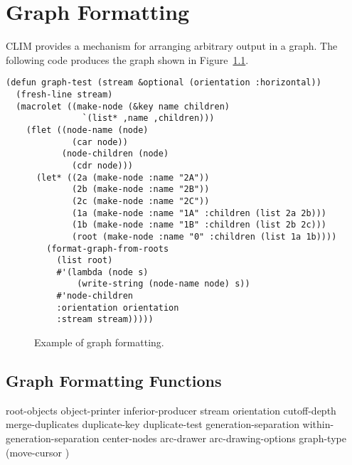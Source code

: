 
\chapter {Graph Formatting}
\label {graph-formatting}

CLIM provides a mechanism for arranging arbitrary output in a graph.  The
following code produces the graph shown in Figure~\ref{graph-example}.

\begin{verbatim}
(defun graph-test (stream &optional (orientation :horizontal)) 
  (fresh-line stream)
  (macrolet ((make-node (&key name children)
               `(list* ,name ,children)))
    (flet ((node-name (node)
             (car node))
           (node-children (node)
             (cdr node)))
      (let* ((2a (make-node :name "2A"))
             (2b (make-node :name "2B"))
             (2c (make-node :name "2C"))
             (1a (make-node :name "1A" :children (list 2a 2b)))
             (1b (make-node :name "1B" :children (list 2b 2c)))
             (root (make-node :name "0" :children (list 1a 1b))))
        (format-graph-from-roots
          (list root)
          #'(lambda (node s)
              (write-string (node-name node) s))
          #'node-children
          :orientation orientation
          :stream stream)))))
\end{verbatim}

\begin{figure}
\ifpsfig\centerline{}\else\vspace{1.75in}\fi
\caption{\label{graph-example} Example of graph formatting.}
\end{figure}


\section {Graph Formatting Functions}

 {root-objects object-printer inferior-producer
                                  \key stream
                                       orientation cutoff-depth
                                       merge-duplicates duplicate-key duplicate-test
                                       generation-separation within-generation-separation
                                       center-nodes
                                       arc-drawer arc-drawing-options
                                       graph-type (move-cursor )}

